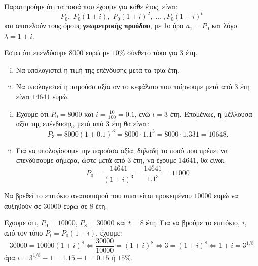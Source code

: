 \documentclass[a4paper,table]{report}
\begin{document}
\begin{rem}
  Παρατηρούμε ότι τα ποσά που έχουμε για κάθε έτος, είναι:
  \[
    P_{0}, \; P_{0}(1+i), \; P_{0}(1+i)^{2}, \; \ldots \;, P_{0}(1+i)^{t} 
  \] 
  και αποτελούν τους όρους \textbf{γεωμετρικής προόδου}, με 1ο όρο $ a_{1}=P_{0} $ και 
  λόγο $ \lambda =1+i $.
\end{rem}

\begin{example}
  Έστω ότι επενδύουμε $ 8000 $ ευρώ με $ 10 \% $ σύνθετο τόκο για 3 έτη.
  \begin{enumerate}[i)]
    \item Να υπολογιστεί η τιμή της επένδυσης μετά τα τρία έτη.
    \item Να υπολογιστεί η παρούσα αξία αν το κεφάλαιο που παίρνουμε μετά από 3 έτη 
      είναι $14641$ ευρώ.
  \end{enumerate}
\end{example}
\begin{solution}
\item {}
  \begin{enumerate}[i)]
    \item 
      Έχουμε ότι $ P_{0} = 8000  $ και $ i= \frac{10}{100} = 0.1 $, ενώ $ t=3 $ έτη. 
      Επομένως, η μέλλουσα αξία της επένδυσης, μετά από 3 έτη θα είναι:
      \[
        P_{3} = 8000(1+0.1)^{3} = 8000 \cdot 1.1^{3} = 8000 \cdot 1.331 = 10648.
      \] 
    \item Για να υπολογίσουμε την παρούσα αξία, δηλαδή το ποσό που πρέπει να 
      επενδύσουμε σήμερα, ώστε μετά από 3 έτη, να έχουμε $14641$, θα είναι:
      \[
        P_{0} = \frac{14641}{(1+i)^{3}} = \frac{14641}{1.1^{3}} = 11000 
      \] 
  \end{enumerate}
\end{solution}

\begin{example}
  Να βρεθεί το επιτόκιο ανατοκισμού που απαιτείται προκειμένου $10000$ ευρώ να αυξηθούν 
  σε $30000$ ευρώ σε 8 έτη.
\end{example}
\begin{solution}
  Έχουμε ότι, $P_{0}=10000$, $ P_{8}=30000 $ και $ t=8 $ έτη. Για να βρούμε το επιτόκιο,
  $ i $, από τον τύπο $ P_{t}=P_{0}(1+i) $, έχουμε:
  \[
    30000 = 10000(1+i)^{8} \Leftrightarrow \frac{30000}{10000} = (1+i)^{8} \Leftrightarrow
    3 = (1+i)^{8} \Leftrightarrow 1+i = 3^{1/8} 
  \] 
  άρα $ i = 3^{1/8} -1 = 1.15-1 = 0.15 $ ή $ 15\% $.
\end{solution}
\end{document}
